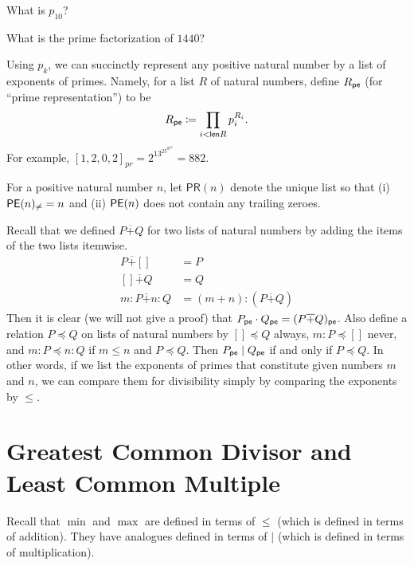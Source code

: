 \begin{exer}
\begin{exercise}
	\item What is $p_10$?
	\item What is the prime factorization of $1440$?
\end{exercise}
\end{exer}

Using $p_k$, we can succinctly represent any positive natural number by a list of exponents of primes.
Namely, for a list $R$ of natural numbers, define $R_{\mathord{\textsf{pe}}}$ (for ``prime representation'') to be 
\[R_{\mathord{\textsf{pe}}} \coloneqq \prod_{i<\mathord{\textsf{len}} R}p_i^{R_i}.\]
For example, $[1,2,0,2]_{pr} = 2^13^25^07^2 = 882$.

For a positive natural number $n$, let $\mathord{\textsf{PR}}(n)$ denote the unique list so that (i) $\mathord{\textsf{PE}}(n)_{\ne}=n$ and (ii) $\mathord{\textsf{PE}}(n)$ does not contain any trailing zeroes.

Recall that we defined $P \overline+ Q$ for two lists of natural numbers by adding the items of the two lists itemwise.
\begin{align*}
	P\overline+ [] &= P\\
	[]\overline+ Q &= Q\\
	m:P\overline+ n:Q &= (m+n):(P\overline+ Q)
\end{align*}
Then it is clear (we will not give a proof) that 
$P_{\mathord{\textsf{pe}}}\cdot Q_{\mathord{\textsf{pe}}} = (P\overline+ Q)_{\mathord{\textsf{pe}}}$.
Also  define a relation $P\preceq Q$ on lists of natural numbers by $[]\preceq Q$ always,
$m:P\preceq []$ never, and $m:P\preceq n:Q$ if $m\leq n$ and $P\preceq Q$. Then $P_{\mathord{\textsf{pe}}}\mid Q_{\mathord{\textsf{pe}}}$ if and only if $P\preceq Q$. In other words, if we list the exponents of primes that constitute given numbers $m$ and $n$, we can compare them for divisibility simply by comparing the exponents by $\leq$.


\section{Greatest Common Divisor and Least Common Multiple}

Recall that $\min$ and $\max$ are defined in terms of $\leq$ (which
is defined in terms of addition). They
have analogues defined in terms of $\mid$ (which  is defined in
terms of multiplication).

